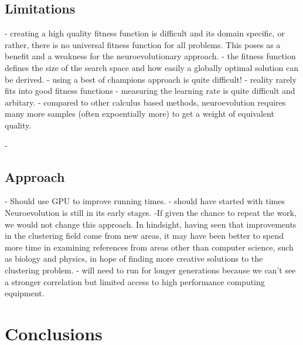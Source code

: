 \documentclass[12pt,a4paper]{article}
\begin{document}
    
    \subsection{Limitations}
    - creating a high quality fitness function is difficult and its domain specific, or rather, there is no universal fitness function for all problems. This poses as a benefit and a weakness for the neuroevolutionary approach.
        - the fitness function defines the size of the search space and how easily a globally optimal solution can be derived.
        - using a best of champions approach is quite difficult!
        - reality rarely fits into good fitness functions
    - measuring the learning rate is quite difficult and arbitary.
    - compared to other calculus based methods, neuroevolution requires many more samples (often expoentially more) to get a weight of equivalent quality.

    -

    \subsection{Approach}
    - Should use GPU to improve running times.
    - should have started with times
    Neuroevolution is still in its early stages.
    -If given the chance to repeat the work, we would not change this approach. In hindsight,
having seen that improvements in the clustering field come from new areas, it may have been
better to spend more time in examining references from areas other than computer science,
such as biology and physics, in hope of finding more creative solutions to the clustering
problem.
    - will need to run for longer generations because we can't see a stronger correlation but limited access to high performance computing equipment.


\section{Conclusions}
\end{document}
